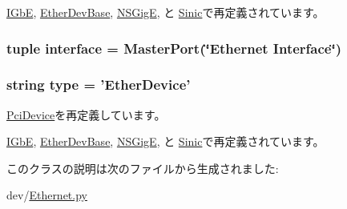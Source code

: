 \hyperlink{classEthernet_1_1IGbE_a17da7064bc5c518791f0c891eff05fda}{IGbE}, \hyperlink{classEthernet_1_1EtherDevBase_a17da7064bc5c518791f0c891eff05fda}{EtherDevBase}, \hyperlink{classEthernet_1_1NSGigE_a17da7064bc5c518791f0c891eff05fda}{NSGigE}, と \hyperlink{classEthernet_1_1Sinic_a17da7064bc5c518791f0c891eff05fda}{Sinic}で再定義されています。\hypertarget{classEthernet_1_1EtherDevice_af9cf0e7acbdb5b49454aa3e590baa5f5}{
\subsubsection[{interface}]{\setlength{\rightskip}{0pt plus 5cm}tuple {\bf interface} = {\bf MasterPort}(\char`\"{}Ethernet Interface\char`\"{})}}
\label{classEthernet_1_1EtherDevice_af9cf0e7acbdb5b49454aa3e590baa5f5}
\hypertarget{classEthernet_1_1EtherDevice_acce15679d830831b0bbe8ebc2a60b2ca}{
\subsubsection[{type}]{\setlength{\rightskip}{0pt plus 5cm}string {\bf type} = '{\bf EtherDevice}'}}
\label{classEthernet_1_1EtherDevice_acce15679d830831b0bbe8ebc2a60b2ca}


\hyperlink{classPci_1_1PciDevice_acce15679d830831b0bbe8ebc2a60b2ca}{PciDevice}を再定義しています。

\hyperlink{classEthernet_1_1IGbE_acce15679d830831b0bbe8ebc2a60b2ca}{IGbE}, \hyperlink{classEthernet_1_1EtherDevBase_acce15679d830831b0bbe8ebc2a60b2ca}{EtherDevBase}, \hyperlink{classEthernet_1_1NSGigE_acce15679d830831b0bbe8ebc2a60b2ca}{NSGigE}, と \hyperlink{classEthernet_1_1Sinic_acce15679d830831b0bbe8ebc2a60b2ca}{Sinic}で再定義されています。

このクラスの説明は次のファイルから生成されました:\begin{DoxyCompactItemize}
\item 
dev/\hyperlink{Ethernet_8py}{Ethernet.py}\end{DoxyCompactItemize}
